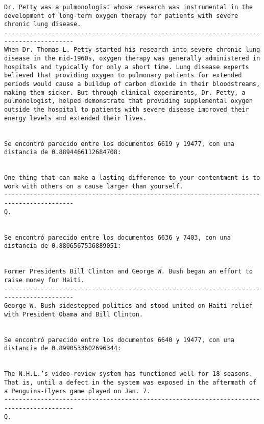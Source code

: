 \documentclass[11pt]{article}
\begin{document}
\begin{Verbatim}[commandchars=\\\{\}]
Dr. Petty was a pulmonologist whose research was instrumental in the development of long-term oxygen therapy for patients with severe chronic lung disease.
-----------------------------------------------------------------------------------------
When Dr. Thomas L. Petty started his research into severe chronic lung disease in the mid-1960s, oxygen therapy was generally administered in hospitals and typically for only a short time. Lung disease experts believed that providing oxygen to pulmonary patients for extended periods would cause a buildup of carbon dioxide in their bloodstreams, making them sicker. But through clinical experiments, Dr. Petty, a pulmonologist, helped demonstrate that providing supplemental oxygen outside the hospital to patients with severe disease improved their energy levels and extended their lives.


Se encontró parecido entre los documentos 6619 y 19477, con una distancia de 0.8894466112684708:


One thing that can make a lasting difference to your contentment is to work with others on a cause larger than yourself.
-----------------------------------------------------------------------------------------
Q.


Se encontró parecido entre los documentos 6636 y 7403, con una distancia de 0.8806567536889051:


Former Presidents Bill Clinton and George W. Bush began an effort to raise money for Haiti.
-----------------------------------------------------------------------------------------
George W. Bush sidestepped politics and stood united on Haiti relief with President Obama and Bill Clinton.


Se encontró parecido entre los documentos 6640 y 19477, con una distancia de 0.8990533602696344:


The N.H.L.’s video-review system has functioned well for 18 seasons. That is, until a defect in the system was exposed in the aftermath of a Penguins-Flyers game played on Jan. 7.
-----------------------------------------------------------------------------------------
Q.

    \end{Verbatim}
\end{document}
